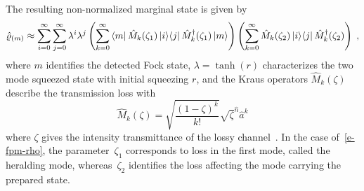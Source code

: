 \documentclass{article}
\begin{document}
The resulting non-normalized marginal state is given by
%
\begin{equation}\label{e-fpm-rho}
  \hatrho_{(m)} \approx
  \sum_{i = 0}^{\infty} 
  \sum_{j = 0}^{\infty}
    \lambda^{i} \lambda^{j}
    \left(
      \sum_{k = 0}^{\infty}
        \bra{m} \hat{M}_{k} (\zeta_{1}) \ketbra{i}{j} \hat{M}_{k}^{\dagger} (\zeta_{1}) \ket{m}
    \right)
    \left(
      \sum_{k = 0}^{\infty}
        \hat{M}_{k}(\zeta_{2}) \ketbra{i}{j} \hat{M}_{k}^{\dagger} (\zeta_{2})
    \right) \Qc
\end{equation}
%
where $m$ identifies the detected Fock state, $\lambda = \tanh(r)$ characterizes the two mode squeezed state with initial squeezing $r$, and the Kraus operators $\hat{M}_{k} (\zeta) $ describe the transmission loss with
%
\begin{equation}
  \hat{M}_{k} (\zeta) =
    \sqrt{ \frac{(1 - \zeta)^{k}}{k!} } 
    \sqrt{\zeta}^{\hat{n}} \hat{a}^{k}
\end{equation}
%
where $\zeta$ gives the intensity transmittance of the lossy channel~\cite{ivan2011}. In the case of~\eqref{e-fpm-rho}, the parameter~$\zeta_{1}$ corresponds to loss in the first mode, called the heralding mode, whereas~$\zeta_{2}$ identifies the loss affecting the mode carrying the prepared state.
\end{document}
